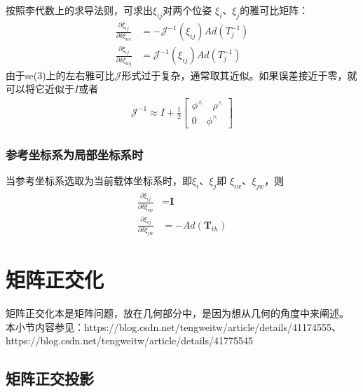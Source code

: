 按照李代数上的求导法则，可求出$\xi_{ij}$对两个位姿 $\xi_i$、$\xi_j$的雅可比矩阵：
\begin{align}
\frac{\partial \xi_{ij}}{\partial \delta\xi_{wi}} &= -\mathcal{J}^{-1}(\xi_{ij})Ad(T_j^{-1})  \\
\frac{\partial \xi_{ij}}{\partial \delta\xi_{wj}} &= \mathcal{J}^{-1}(\xi_{ij})Ad(T_j^{-1})
\end{align}
由于se(3)上的左右雅可比$\mathcal{J}$形式过于复杂，通常取其近似。如果误差接近于零，就可以将它近似于$I$或者
\begin{align}
\mathcal{J}^{-1} \approx I+\frac{1}{2}\left[\begin{array}{cc}
\phi^\wedge \quad  \rho^\wedge \\
0      \quad  \phi^\wedge
\end{array}
\right]
\end{align}


\subsubsection{参考坐标系为局部坐标系时}
当参考坐标系选取为当前载体坐标系时，即$\xi_i$、$\xi_j$即 $\xi_{iw}$、$\xi_{jw}$，则\\
\begin{align}
\frac{\partial \xi_{ij}}{\partial \delta\xi_{iw}} &= \textbf{I}  \\
\frac{\partial \xi_{ij}}{\partial \delta\xi_{jw}} &= -Ad(\textbf{T}_{th})
\end{align}

\section{矩阵正交化}
矩阵正交化本是矩阵问题，放在几何部分中，是因为想从几何的角度中来阐述。\\
本小节内容参见：https://blog.csdn.net/tengweitw/article/details/41174555、\\
https://blog.csdn.net/tengweitw/article/details/41775545\\

\subsection*{矩阵正交投影}

